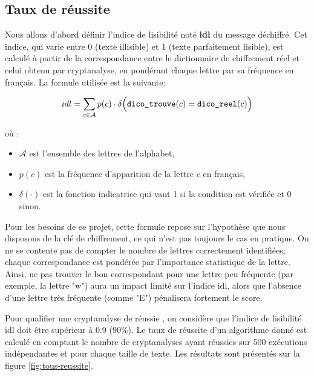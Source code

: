 \documentclass[a4paper]{article}
\begin{document}
\subsection{Taux de réussite}
\label{sec:Taux_de_réussite}

Nous allons d'abord définir l'indice de lisibilité noté \textbf{idl} du message déchiffré. Cet indice, qui varie entre 0 (texte illisible) et 1 (texte parfaitement lisible), est calculé à partir de la correspondance entre le dictionnaire de chiffrement réel et celui obtenu par cryptanalyse, en pondérant chaque lettre par sa fréquence en français. 
La formule utilisée est la suivante:

\[
idl = \sum_{c \in \mathcal{A}} p(c) \cdot \delta\Bigl(\texttt{dico\_trouve}(c) = \texttt{dico\_reel}(c)\Bigr)
\]


où :
\begin{itemize}
  \item \(\mathcal{A}\) est l'ensemble des lettres de l'alphabet,
  \item \(p(c)\) est la fréquence d'apparition de la lettre \(c\) en français,
  \item \(\delta(\cdot)\) est la fonction indicatrice qui vaut 1 si la condition est vérifiée et 0 sinon.
\end{itemize}

Pour les besoins de ce projet, cette formule repose sur l'hypothèse que nous disposons de la clé de chiffrement, ce qui n'est pas toujours le cas en pratique.
On ne se contente pas de compter le nombre de lettres correctement identifiées; chaque correspondance est pondérée par l'importance statistique de la lettre. Ainsi, ne pas trouver le bon correspondant pour une lettre peu fréquente (par exemple, la lettre "w") aura un impact limité sur l'indice idl, alors que l'absence d'une lettre très fréquente (comme "E") pénalisera fortement le score.

Pour qualifier une cryptanalyse de \og réussie \fg{}, on considère que l'indice de lisibilité idl doit être supérieur à 0.9 (90\%). Le taux de réussite d'un algorithme donné est calculé en comptant le nombre de cryptanalyses ayant \og réussies \fg{} sur 500 exécutions indépendantes et pour chaque taille de texte. Les résultats sont présentés sur la figure \ref{fig:tous-reussite}.
\end{document}
